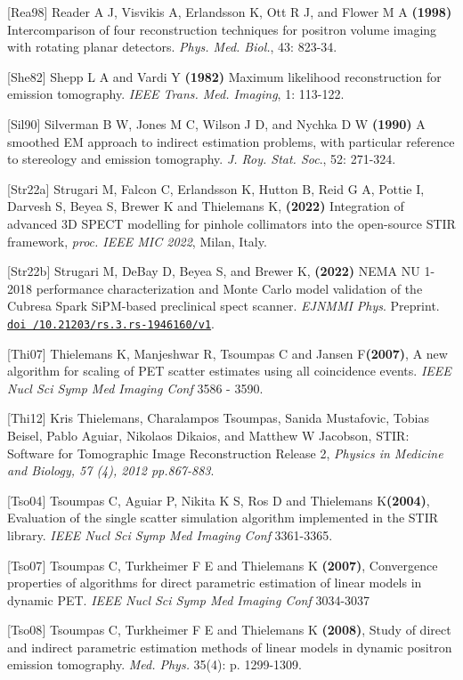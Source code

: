 \documentclass{article}
\def\url#1#2{\mbox{\href{#1}{\tt #2}}}
\begin{document}
{{{{{{ {[}Rea98] Reader A J, Visvikis A, Erlandsson K, Ott R J, and Flower 
M A \textbf{(1998)} Intercomparison of four reconstruction techniques 
for positron volume imaging with rotating planar detectors. \textit{Phys. 
Med. Biol.}, 43: 823-34.

{[}She82] Shepp L A and Vardi Y \textbf{(1982)} Maximum likelihood reconstruction 
for emission tomography. \textit{IEEE Trans. Med. Imaging}, 1: 113-122.

{[}Sil90] Silverman B W, Jones M C, Wilson J D, and Nychka D W \textbf{(1990)} 
A smoothed EM approach to indirect estimation problems, with 
particular reference to stereology and emission tomography. \textit{J. 
Roy. Stat. Soc}., 52: 271-324. 

[Str22a] Strugari M, Falcon C, Erlandsson K, Hutton B, Reid G A, Pottie I, Darvesh S, Beyea S, Brewer K and Thielemans K, \textbf{(2022)} Integration of advanced 3D SPECT modelling for pinhole collimators into the open-source STIR framework, \textit{proc. IEEE MIC 2022}, Milan, Italy.

[Str22b] Strugari M, DeBay D, Beyea S, and Brewer K, \textbf{(2022)} NEMA NU 1-2018 performance characterization and Monte Carlo model validation 
of the Cubresa Spark SiPM-based preclinical spect scanner. \textit{EJNMMI Phys}. Preprint. \url{https://doi.org/10.21203/rs.3.rs-1946160/v1}{doi /10.21203/rs.3.rs-1946160/v1}.

{[}Thi07{]} Thielemans K, Manjeshwar R, Tsoumpas C and Jansen F\textbf{(2007)}, 
A new algorithm for scaling of PET scatter estimates using all coincidence events. 
\textit { IEEE Nucl Sci Symp Med Imaging Conf } 3586 - 3590.

{[}Thi12] Kris Thielemans, Charalampos Tsoumpas, Sanida Mustafovic, Tobias Beisel, Pablo Aguiar, Nikolaos Dikaios, and Matthew W Jacobson,
STIR: Software for Tomographic Image Reconstruction Release 2,
\textit{Physics in Medicine and Biology, 57 (4), 2012 pp.867-883}.

{[}Tso04{]} Tsoumpas C, Aguiar P, Nikita K S, Ros D and Thielemans K\textbf{(2004)}, 
Evaluation of the single scatter simulation algorithm implemented in the STIR library. 
\textit { IEEE Nucl Sci Symp Med Imaging Conf } 3361-3365.

{[}Tso07{]} Tsoumpas C, Turkheimer F E and Thielemans K  \textbf{(2007)}, 
Convergence properties of algorithms for direct parametric estimation of linear models in dynamic PET. 
\textit{IEEE Nucl Sci Symp Med Imaging Conf} 3034-3037

{[}Tso08{]} Tsoumpas C, Turkheimer F E and Thielemans K \textbf{(2008)}, Study of direct and indirect 
parametric estimation methods of linear models in dynamic positron emission tomography. \textit{Med. Phys.} 
35(4): p. 1299-1309.

}}}}}}
\end{document}
